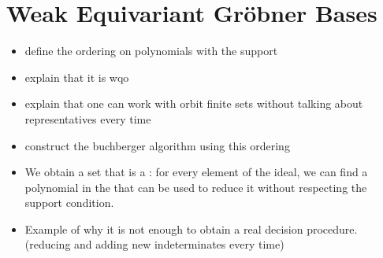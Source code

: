 \section{Weak Equivariant Gröbner Bases}
\label{sec:weakgb}

\begin{itemize}
  \item define the ordering on polynomials with the support
  \item explain that it is wqo
  \item explain that one can work with orbit finite sets
    without talking about representatives every time
  \item construct the buchberger algorithm using this ordering
  \item We obtain a set that is a :
    for every element of the ideal, we can find a polynomial in the
     that can be used to reduce it without
    respecting the support condition.
  \item Example of why it is not enough to obtain a real 
    decision procedure.
  (reducing and adding new indeterminates every time)
\end{itemize}


